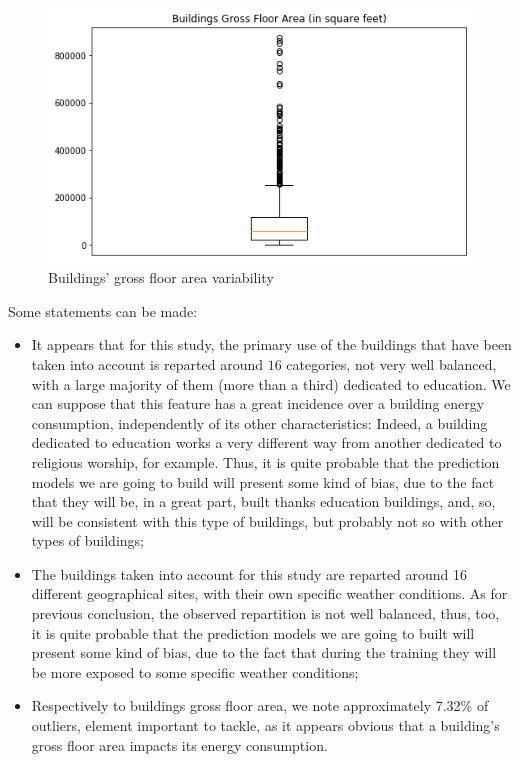 \documentclass[twocolumn, switch]{article}
\begin{document}
\begin{figure}[H]
\centering
\includegraphics[scale=0.35]{../graphs/buildings_gross_floor_area}
\caption{Buildings' gross floor area variability}
\label{fig:buildings_gross_floor_area}
\end{figure}

Some statements can be made:

\begin{itemize}
\item It appears that for this study, the primary use of the buildings that have been taken into account is reparted around $16$ categories, not very well balanced, with a large majority of them (more than a third) dedicated to education. We can suppose that this feature has a great incidence over a building energy consumption, independently of its other characteristics: Indeed, a building dedicated to education works a very different way from another dedicated to religious worship, for example. Thus, it is quite probable that the prediction models we are going to build will present some kind of bias, due to the fact that they will be, in a great part, built thanks education buildings, and, so, will be consistent with this type of buildings, but probably not so with other types of buildings;
\item The buildings taken into account for this study are reparted around 16 different geographical sites, with their own specific weather conditions. As for previous conclusion, the observed repartition is not well balanced, thus, too, it is quite probable that the prediction models we are going to built will present some kind of bias, due to the fact that during the training they will be more exposed to some specific weather conditions;
\item Respectively to buildings gross floor area, we note approximately 7.32\% of outliers, element important to tackle, as it appears obvious that a building's gross floor area impacts its energy consumption.
\end{itemize}
\end{document}
